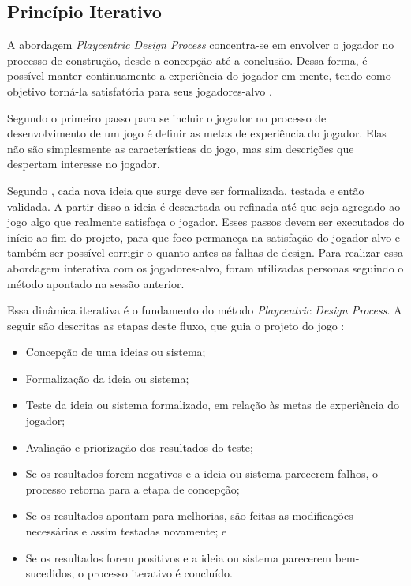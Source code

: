 \subsection{Princípio Iterativo}

A abordagem \textit{Playcentric Design Process} concentra-se em envolver o jogador no processo de construção, desde a concepção até a conclusão. Dessa forma, é possível manter continuamente a experiência do jogador em mente, tendo como objetivo torná-la satisfatória para seus jogadores-alvo \cite[p. 10]{Fullerton_2008}. %

Segundo  o primeiro passo para se incluir o jogador no processo de desenvolvimento de um jogo é definir as metas de experiência do jogador. Elas não são simplesmente as características do jogo, mas sim descrições que despertam interesse no jogador. %

Segundo , cada nova ideia que surge deve ser formalizada, testada e então validada. A partir disso a ideia é descartada ou refinada até que seja agregado ao jogo algo que realmente satisfaça o jogador. Esses passos devem ser executados do início ao fim do projeto, para que foco permaneça na satisfação do jogador-alvo e também ser possível corrigir o quanto antes as falhas de design. Para realizar essa abordagem interativa com os jogadores-alvo, foram utilizadas personas seguindo o método apontado na sessão anterior. %

Essa dinâmica iterativa é o fundamento do método \textit{Playcentric Design Process}. A seguir são descritas as etapas deste fluxo, que guia o projeto do jogo \cite[p. 14]{Fullerton_2008}: %

\begin{itemize}

    \item Concepção de uma ideias ou sistema;
    \item Formalização da ideia ou sistema;
    \item Teste da ideia ou sistema formalizado, em relação às metas de experiência do jogador;
    \item Avaliação e priorização dos resultados do teste;
    \item Se os resultados forem negativos e a ideia ou sistema parecerem falhos, o processo retorna para a etapa de concepção;
    \item Se os resultados apontam para melhorias, são feitas as modificações necessárias e assim testadas novamente; e
    \item Se os resultados forem positivos e a ideia ou sistema parecerem bem-sucedidos, o processo iterativo é concluído. 
\end{itemize}

